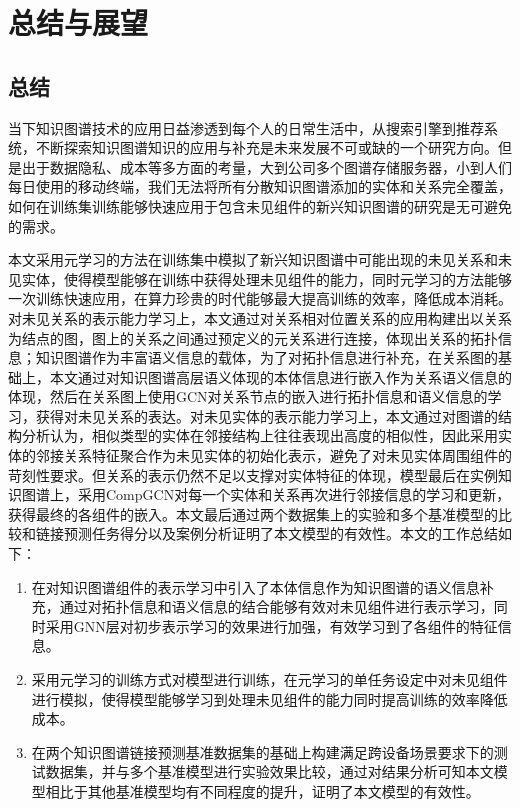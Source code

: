 \chapter{总结与展望}

\section{总结}
当下知识图谱技术的应用日益渗透到每个人的日常生活中，从搜索引擎到推荐系统，不断探索知识图谱知识的应用与补充是未来发展不可或缺的一个研究方向。但是出于数据隐私、成本等多方面的考量，大到公司多个图谱存储服务器，小到人们每日使用的移动终端，我们无法将所有分散知识图谱添加的实体和关系完全覆盖，如何在训练集训练能够快速应用于包含未见组件的新兴知识图谱的研究是无可避免的需求。

本文采用元学习的方法在训练集中模拟了新兴知识图谱中可能出现的未见关系和未见实体，使得模型能够在训练中获得处理未见组件的能力，同时元学习的方法能够一次训练快速应用，在算力珍贵的时代能够最大提高训练的效率，降低成本消耗。对未见关系的表示能力学习上，本文通过对关系相对位置关系的应用构建出以关系为结点的图，图上的关系之间通过预定义的元关系进行连接，体现出关系的拓扑信息；知识图谱作为丰富语义信息的载体，为了对拓扑信息进行补充，在关系图的基础上，本文通过对知识图谱高层语义体现的本体信息进行嵌入作为关系语义信息的体现，然后在关系图上使用GCN对关系节点的嵌入进行拓扑信息和语义信息的学习，获得对未见关系的表达。对未见实体的表示能力学习上，本文通过对图谱的结构分析认为，相似类型的实体在邻接结构上往往表现出高度的相似性，因此采用实体的邻接关系特征聚合作为未见实体的初始化表示，避免了对未见实体周围组件的苛刻性要求。但关系的表示仍然不足以支撑对实体特征的体现，模型最后在实例知识图谱上，采用CompGCN对每一个实体和关系再次进行邻接信息的学习和更新，获得最终的各组件的嵌入。本文最后通过两个数据集上的实验和多个基准模型的比较和链接预测任务得分以及案例分析证明了本文模型的有效性。本文的工作总结如下：
\begin{enumerate}[label=\arabic*)]
  \item 在对知识图谱组件的表示学习中引入了本体信息作为知识图谱的语义信息补充，通过对拓扑信息和语义信息的结合能够有效对未见组件进行表示学习，同时采用GNN层对初步表示学习的效果进行加强，有效学习到了各组件的特征信息。
  \item 采用元学习的训练方式对模型进行训练，在元学习的单任务设定中对未见组件进行模拟，使得模型能够学习到处理未见组件的能力同时提高训练的效率降低成本。
  \item 在两个知识图谱链接预测基准数据集的基础上构建满足跨设备场景要求下的测试数据集，并与多个基准模型进行实验效果比较，通过对结果分析可知本文模型相比于其他基准模型均有不同程度的提升，证明了本文模型的有效性。
\end{enumerate}

